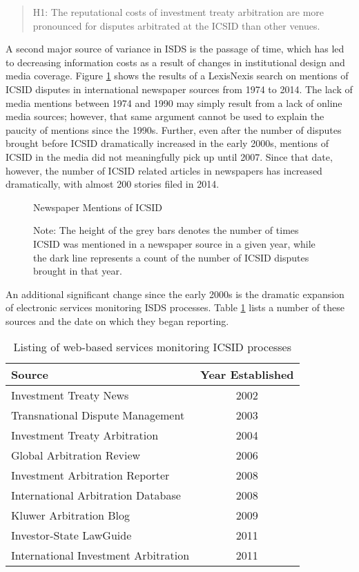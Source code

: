 \documentclass[12pt,onesided]{amsart}
\begin{document}
\begin{quote}
H1: The reputational costs of investment treaty arbitration are more pronounced for disputes arbitrated at the ICSID than other venues.
\end{quote}

A second major source of variance in ISDS is the passage of time, which has led to decreasing information costs as a result of changes in institutional design and media coverage. Figure \ref{fig:icsidMedia} shows the results of a LexisNexis search on mentions of ICSID disputes in international newspaper sources from 1974 to 2014. The lack of media mentions between 1974 and 1990 may simply result from a lack of online media sources; however, that same argument cannot be used to explain the paucity of mentions since the 1990s. Further, even after the number of disputes brought before ICSID dramatically increased in the early 2000s, mentions of ICSID in the media did not meaningfully pick up until 2007. Since that date, however, the number of ICSID related articles in newspapers has increased dramatically, with almost 200 stories filed in 2014. 

\begin{figure}[ht]
	\centering
	\caption{Newspaper Mentions of ICSID}
	\label{fig:icsidMedia}
	\resizebox{.8\textwidth}{!}{}
	\caption*{Note: The height of the grey bars denotes the number of times ICSID was mentioned in a newspaper source in a given year, while the dark line represents a count of the number of ICSID disputes brought in that year.}
\end{figure}
\FloatBarrier

An additional significant change since the early 2000s is the dramatic expansion of electronic services monitoring ISDS processes. Table \ref{tab:disputeSites} lists a number of these sources and the date on which they began reporting. 

\begin{table}[ht]
\centering
\caption{Listing of web-based services monitoring ICSID processes}
\label{tab:disputeSites}
\begin{tabular}{lc}
	\hline\hline
	Source & Year Established \\
	\hline
	Investment Treaty News & 2002 \\
	Transnational Dispute Management & 2003 \\
	Investment Treaty Arbitration & 2004 \\
	Global Arbitration Review & 2006 \\
	Investment Arbitration Reporter & 2008 \\
	International Arbitration Database & 2008 \\
	Kluwer Arbitration Blog & 2009 \\
	Investor-State LawGuide & 2011 \\
	International Investment Arbitration & 2011 \\
	\hline\hline
\end{tabular}
\end{table}
\FloatBarrier
\end{document}
